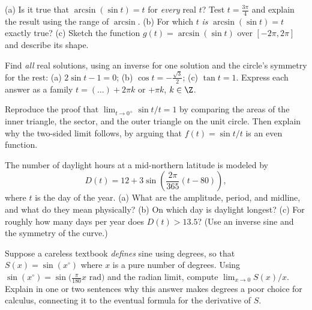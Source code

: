 \begin{exercise}
(a) Is it true that $\arcsin(\sin t) = t$ for \emph{every} real $t$? Test $t = \tfrac{3\pi}{4}$ and explain the result using the range of $\arcsin$.
(b) For which $t$ \emph{is} $\arcsin(\sin t) = t$ exactly true?
(c) Sketch the function $g(t) = \arcsin(\sin t)$ over $[-2\pi, 2\pi]$ and describe its shape.
\end{exercise}

\begin{exercise}
Find \emph{all} real solutions, using an inverse for one solution and the circle's symmetry for the rest:
(a) $2\sin t - 1 = 0$;\quad
(b) $\cos t = -\tfrac{\sqrt3}{2}$;\quad
(c) $\tan t = 1$. Express each answer as a family $t = (\ldots) + 2\pi k$ or $+\pi k$, $k\in\Z$.
\end{exercise}

\begin{exercise}
Reproduce the proof that $\lim_{t\to 0^+}\sin t/t = 1$ by comparing the areas of the inner triangle, the sector, and the outer triangle on the unit circle. Then explain why the two-sided limit follows, by arguing that $f(t) = \sin t/t$ is an even function.
\end{exercise}

\begin{exercise}
The number of daylight hours at a mid-northern latitude is modeled by
\[
  D(t) = 12 + 3\sin\!\left(\frac{2\pi}{365}(t - 80)\right),
\]
where $t$ is the day of the year. (a) What are the amplitude, period, and midline, and what do they mean physically? (b) On which day is daylight longest? (c) For roughly how many days per year does $D(t) > 13.5$? (Use an inverse sine and the symmetry of the curve.)
\end{exercise}

\begin{exercise}
Suppose a careless textbook \emph{defines} sine using degrees, so that $S(x) = \sin(x^\circ)$ where $x$ is a pure number of degrees. Using $\sin(x^\circ) = \sin\!\big(\tfrac{\pi}{180}x \text{ rad}\big)$ and the radian limit, compute $\lim_{x\to0} S(x)/x$. Explain in one or two sentences why this answer makes degrees a poor choice for calculus, connecting it to the eventual formula for the derivative of $S$.
\end{exercise}
